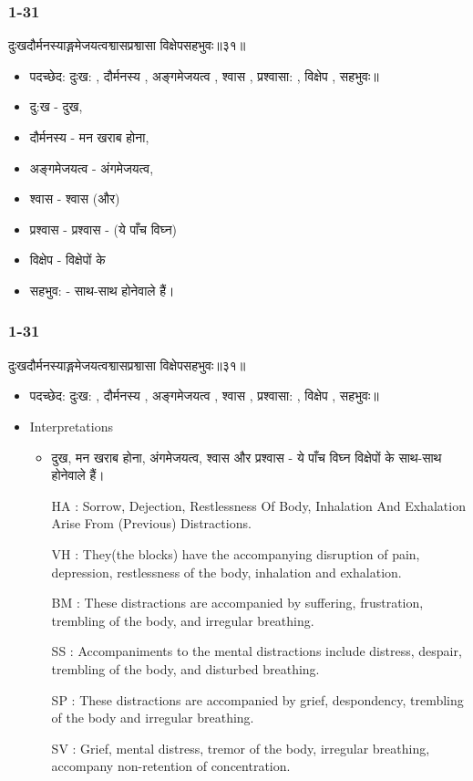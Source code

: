 \begin{frame}[fragile]\frametitle{1-31}
\begin{sanskrit}
दुःखदौर्मनस्याङ्गमेजयत्वश्वासप्रश्वासा विक्षेपसहभुवः॥३१॥
\end{sanskrit}

	\begin{itemize}
	\item पदच्छेद: दुःख: , दौर्मनस्य , अङ्गमेजयत्व , श्वास , प्रश्वासा: , विक्षेप , सहभुवः॥
	\item दु:ख - दुख,
	\item दौर्मनस्य - मन खराब होना,
	\item अङ्गमेजयत्व - अंगमेजयत्व,
	\item श्वास - श्वास (और)
	\item प्रश्वास - प्रश्वास - (ये पाँच विघ्न)
	\item विक्षेप - विक्षेपों के
	\item सहभुव: - साथ-साथ होनेवाले हैं।

	\end{itemize}
	
\end{frame}

\begin{frame}[fragile]\frametitle{1-31}
\begin{sanskrit}
दुःखदौर्मनस्याङ्गमेजयत्वश्वासप्रश्वासा विक्षेपसहभुवः॥३१॥
\end{sanskrit}

	\begin{itemize}
	\item पदच्छेद: दुःख: , दौर्मनस्य , अङ्गमेजयत्व , श्वास , प्रश्वासा: , विक्षेप , सहभुवः॥
	\item Interpretations
		\begin{itemize}	
		\item दुख, मन खराब होना, अंगमेजयत्व, श्वास और प्रश्वास - ये पाँच विघ्न विक्षेपों के साथ-साथ होनेवाले हैं।
		\item [HA]: Sorrow, Dejection, Restlessness Of Body, Inhalation And Exhalation Arise From (Previous) Distractions.
		\item [VH]: They(the blocks) have the accompanying disruption of pain, depression, restlessness of the body, inhalation and exhalation.
		\item [BM]: These distractions are accompanied by suffering, frustration, trembling of the body, and irregular breathing.
		\item [SS]: Accompaniments to the mental distractions include distress, despair, trembling of the body, and disturbed breathing.
		\item [SP]: These distractions are accompanied by grief, despondency, trembling of the body and irregular breathing.
		\item [SV]: Grief, mental distress, tremor of the body, irregular breathing, accompany non-retention of concentration. 
		\end{itemize}
	\end{itemize}
	
\end{frame}

